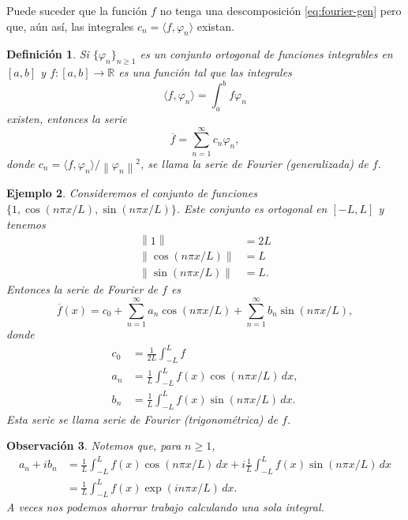 \documentclass[11pt,letterpaper,draft]{report}
\newtheorem{defn}{Definición}[chapter]
\newtheorem{example}[defn]{Ejemplo}
\newtheorem{obs}[defn]{Observación}
\newcommand\R{\mathbb R}
\newcommand\norm[1]{\left\|#1\right\|}
\newcommand\<{\langle}
\renewcommand\>{\rangle}
\renewcommand\phi\varphi
\begin{document}
Puede suceder que la función $f$ no tenga una descomposición
\eqref{eq:fourier-gen} pero que, aún así,
las integrales $c_n=\<f,\phi_n\>$ existan.

\begin{defn}
  Si $\{\phi_n\}_{n\geq 1}$ es un conjunto ortogonal de funciones
  integrables en $[a,b]$ y $f:[a,b]\to\R$ es una función
  tal que las integrales
  \[
   \<f,\phi_n\> = \int_{a}^{b}f\phi_n
  \]
  existen, entonces la serie
  \[
    \overline{f}=\sum_{n=1}^{\infty}c_n\phi_n
  ,\]
  donde $c_n = \<f,\phi_n\>/\norm{\phi_n}^{2}$, se llama
  la serie de Fourier (generalizada) de $f$.
\end{defn}

\begin{example}
  Consideremos el conjunto de funciones
  $\{1,\cos(n\pi x/L),\sin(n\pi x/L)\}$.
  Este conjunto es ortogonal en $[-L,L]$ y tenemos
  \begin{align*}
    \norm{1} &= 2L \\
    \norm{\cos(n\pi x/L)} &= L \\
    \norm{\sin(n\pi x/L)} &= L.
  \end{align*}
  Entonces la serie de Fourier de $f$ es
  \begin{equation}\label{eq:serie-fourier}
    \overline{f}(x) = c_0
    + \sum_{n=1}^\infty a_n\cos(n\pi x/L)
    + \sum_{n=1}^\infty b_n\sin(n\pi x/L)
  ,
  \end{equation}
  donde
  \begin{align*}
    c_0 &= \frac{1}{2L}\int_{-L}^L f \\
    a_n &= \frac{1}{L}\int_{-L}^L f(x)\cos(n\pi x/L)\,dx, \\
    b_n &= \frac{1}{L}\int_{-L}^L f(x)\sin(n\pi x/L)\,dx.
  \end{align*}
  Esta serie se llama serie de Fourier (trigonométrica) de $f$.
\end{example}

\begin{obs}
Notemos que, para $n\geq 1$,
\begin{align*}
  a_n+ib_n
  &= \frac{1}{L}\int_{-L}^L f(x)\cos(n\pi x/L)\,dx
    + i\frac{1}{L}\int_{-L}^L f(x)\sin(n\pi x/L)\,dx \\
  &= \frac{1}{L}\int_{-L}^L f(x)\exp(in\pi x/L)\,dx.
\end{align*}
A veces nos podemos ahorrar trabajo calculando una sola integral.
\end{obs}
\end{document}
